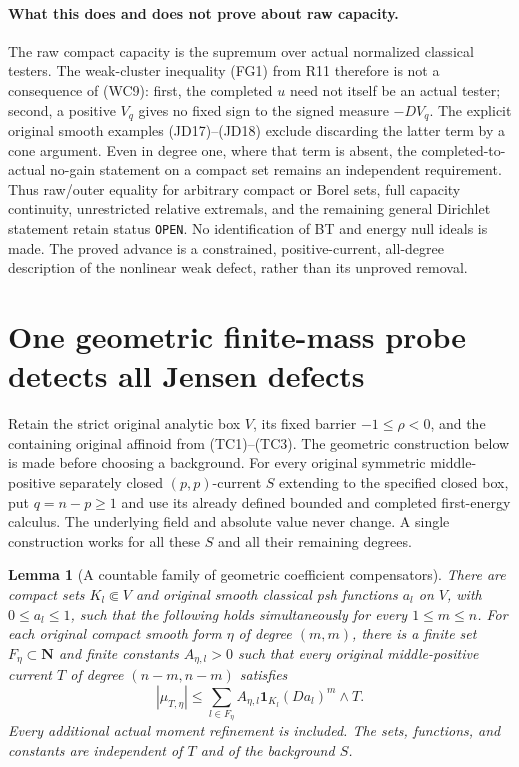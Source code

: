 \documentclass[11pt,a4paper]{article}
\numberwithin{equation}{section}
\newtheorem{lemma}[theorem]{Lemma}
\theoremstyle{definition}
\theoremstyle{remark}
\begin{document}
\paragraph{What this does and does not prove about raw capacity.}
The raw compact capacity is the supremum over actual normalized
classical testers.  The weak-cluster inequality (FG1) from R11
therefore is not a consequence of (WC9): first, the completed
$u$ need not itself be an actual tester; second, a positive
$V_q$ gives no fixed sign to the signed measure $-DV_q$.
The explicit original smooth examples (JD17)--(JD18) exclude
discarding the latter term by a cone argument.  Even in degree
one, where that term is absent, the completed-to-actual no-gain
statement on a compact set remains an independent requirement.
Thus raw/outer equality for arbitrary compact or Borel sets,
full capacity continuity, unrestricted relative extremals, and
the remaining general Dirichlet statement retain status
\texttt{OPEN}.  No identification of BT and energy null ideals
is made.  The proved advance is a constrained, positive-current,
all-degree description of the nonlinear weak defect, rather
than its unproved removal.



\section{One geometric finite-mass probe detects all Jensen defects}
\label{sec:r12-universal-jensen-probe}

Retain the strict original analytic box $V$, its fixed barrier
$-1\leq\rho<0$, and the containing original affinoid from
(TC1)--(TC3).  The geometric construction below is made before
choosing a background.  For every original symmetric middle-positive
separately closed $(p,p)$-current $S$ extending to the specified
closed box, put $q=n-p\geq1$ and use its already defined bounded
and completed first-energy calculus.  The underlying field and
absolute value never change.  A single construction works for
all these $S$ and all their remaining degrees.

\begin{lemma}[A countable family of geometric coefficient compensators]
\label{lem:r12-countable-geometric-compensators}
There are compact sets $K_l\Subset V$ and original smooth classical
psh functions $a_l$ on $V$, with $0\leq a_l\leq1$, such that the
following holds simultaneously for every $1\leq m\leq n$.
For each original compact smooth form $\eta$ of degree $(m,m)$,
there is a finite set $F_\eta\subset\mathbf N$ and finite constants
$A_{\eta,l}>0$ such that every original middle-positive current
$T$ of degree $(n-m,n-m)$ satisfies
\[
       |\mu_{T,\eta}|
         \leq\sum_{l\in F_\eta}A_{\eta,l}\mathbf1_{K_l}
                                      (Da_l)^m\wedge T.
 \tag{UP1}
\]
Every additional actual moment refinement is included.  The sets,
functions, and constants are independent of $T$ and of the
background $S$.
\end{lemma}
\end{document}
